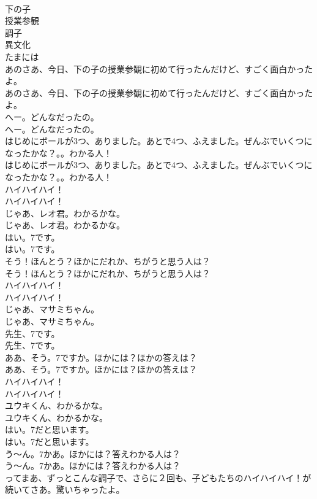 \documentclass[8pt]{extreport}
\begin{document}
\begin{CJK}{UTF8}{min}
\\	下の子
\\	授業参観
\\	調子
\\	異文化
\\	たまには
\\	あのさあ、今日、下の子の授業参観に初めて行ったんだけど、すごく面白かったよ。	
\\	あのさあ、今日、下の子の授業参観に初めて行ったんだけど、すごく面白かったよ。 
\\	へー。どんなだったの。	
\\	へー。どんなだったの。 
\\	はじめにボールが3つ、ありました。あとで4つ、ふえました。ぜんぶでいくつになったかな？。。わかる人！	
\\	はじめにボールが3つ、ありました。あとで4つ、ふえました。ぜんぶでいくつになったかな？。。わかる人！ 
\\	ハイハイハイ！	
\\	ハイハイハイ！ 
\\	じゃあ、レオ君。わかるかな。	
\\	じゃあ、レオ君。わかるかな。 
\\	はい。7です。	
\\	はい。7です。 
\\	そう！ほんとう？ほかにだれか、ちがうと思う人は？	
\\	そう！ほんとう？ほかにだれか、ちがうと思う人は？ 
\\	ハイハイハイ！	
\\	ハイハイハイ！ 
\\	じゃあ、マサミちゃん。	
\\	じゃあ、マサミちゃん。 
\\	先生、7です。	
\\	先生、7です。 
\\	ああ、そう。7ですか。ほかには？ほかの答えは？	
\\	ああ、そう。7ですか。ほかには？ほかの答えは？ 
\\	ハイハイハイ！	
\\	ハイハイハイ！ 
\\	ユウキくん、わかるかな。	
\\	ユウキくん、わかるかな。 
\\	はい。7だと思います。	
\\	はい。7だと思います。 
\\	う〜ん。7かあ。ほかには？答えわかる人は？	
\\	う〜ん。7かあ。ほかには？答えわかる人は？ 
\\	ってまあ、ずっとこんな調子で、さらに２回も、子どもたちのハイハイハイ！が続いてさあ。驚いちゃったよ。	

\end{CJK}
\end{document}
